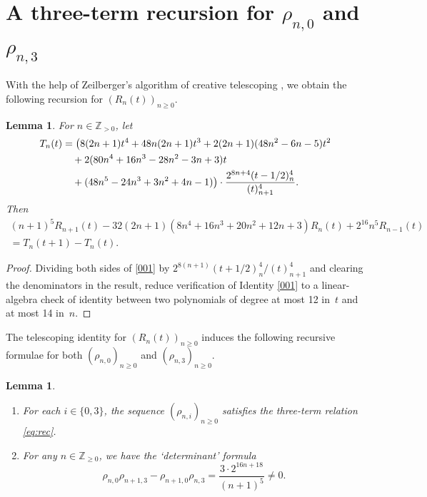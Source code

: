 \documentclass[12pt]{article}
\let\ge\geqslant
\newtheorem{lemma}[theorem]{Lemma}
\theoremstyle{remark}
\numberwithin{equation}{section}
\begin{document}
\section{A three-term recursion for $\rho_{n,0}$ and $\rho_{n,3}$}

With the help of Zeilberger’s algorithm of creative telescoping \cite[Chap.~6]{PWZ1997}, we obtain the following recursion for $(R_n(t))_{n \ge 0}$.

\begin{lemma}
For $n \in \mathbb{Z}_{>0}$, let
\begin{align}
T_n(t)
&=\big(8(2n+1)t^4 + 48n(2n+1)t^3 + 2(2n+1)(48n^2-6n-5)t^2
\notag\\ &\quad
+ 2(80n^4 + 16n^3 - 28n^2 - 3n + 3)t
\notag\\ &\quad
+ (48n^5 - 24n^3 + 3n^2 + 4n - 1)\big)
\cdot\frac{2^{8n+4}(t-1/2)_n^4}{(t)_{n+1}^4}.
\label{def_T_n(t)}
\end{align}
Then
\begin{multline}
(n+1)^5 R_{n+1}(t) - 32(2n+1)(8n^4+16n^3+20n^2+12n+3) R_n(t) + 2^{16}n^5 R_{n-1}(t)
\\
= T_n(t+1) - T_n(t).
\label{001}
\end{multline} 
\end{lemma}

\begin{proof}
Dividing both sides of \eqref{001} by $2^{8(n+1)}(t+1/2)_{n}^4 / (t)_{n+1}^4$ and clearing the denominators in the result, reduce verification of Identity \eqref{001} to a linear-algebra check of identity between two polynomials of degree at most 12 in~$t$ and at most 14 in~$n$.
\end{proof}

The telescoping identity for $(R_n(t))_{n \ge 0}$ induces the following recursive formulae for both $(\rho_{n,0})_{n \ge 0}$ and $(\rho_{n,3})_{n \ge 0}$.

\begin{lemma}
\label{lem_rec}
\begin{enumerate}
\item[\textup{(a)}] For each $i \in \{0,3\}$, the sequence $(\rho_{n,i})_{n \ge 0}$ satisfies the three-term relation \eqref{eq:rec}.
\item[\textup{(b)}] For any $n \in \mathbb{Z}_{\ge0}$, we have the `determinant' formula
\[
\rho_{n,0}\rho_{n+1,3} - \rho_{n+1,0}\rho_{n,3} = \frac{3 \cdot2^{16n+18}}{(n+1)^5} \ne 0. 
\]
\end{enumerate}
\end{lemma}
\end{document}
